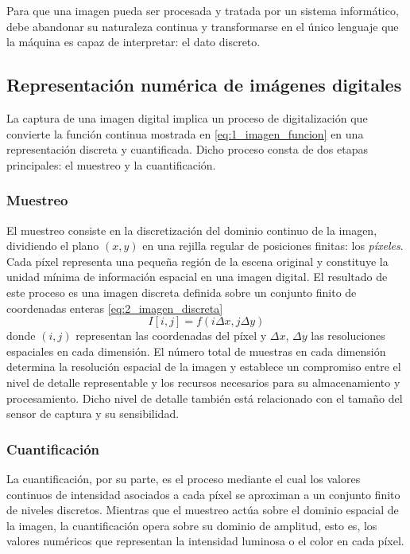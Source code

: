 Para que una imagen pueda ser procesada y tratada por un sistema informático, debe
abandonar su naturaleza continua y transformarse en el único lenguaje que la 
máquina es capaz de interpretar: el dato discreto.

\newpage

\subsection{Representación numérica de imágenes digitales} \label{subsec:3_2_representacion_numerica_imagenes_digitales}
La captura de una imagen digital implica un proceso de digitalización que convierte la función continua
mostrada en \eqref{eq:1_imagen_funcion} en una representación discreta y cuantificada. 
Dicho proceso consta de dos etapas principales: el muestreo y la cuantificación.

\subsubsection{Muestreo} \label{subsubsec:3_2_1_muestreo}
El muestreo consiste en la discretización del dominio continuo de la imagen, dividiendo 
el plano $(x, y)$ en una rejilla regular de posiciones finitas: los \textit{píxeles}. Cada píxel representa una pequeña región de la escena original
y constituye la unidad mínima de información espacial en una imagen digital. 
El resultado de este proceso es una imagen discreta definida sobre un conjunto finito de 
coordenadas enteras \eqref{eq:2_imagen_discreta}
\begin{equation}
    I[i,j] = f(i \Delta x, j \Delta y)
    \label{eq:2_imagen_discreta}
\end{equation}
donde $(i,j)$ representan las coordenadas del píxel y $\Delta x$, $\Delta y$ las resoluciones
espaciales en cada dimensión. El número total de muestras en cada dimensión determina la 
resolución espacial de la imagen y establece un compromiso entre el nivel de detalle representable 
y los recursos necesarios para su almacenamiento y procesamiento. Dicho nivel de detalle también 
está relacionado con el tamaño del sensor de captura y su sensibilidad.

\subsubsection{Cuantificación} \label{subsubsec:3_2_2_cuantificacion}
La cuantificación, por su parte, es el proceso mediante el cual los valores continuos de intensidad
asociados a cada píxel se aproximan a un conjunto finito de niveles discretos. Mientras que el muestreo 
actúa sobre el dominio espacial de la imagen, la cuantificación opera sobre su dominio de amplitud, esto 
es, los valores numéricos que representan la intensidad luminosa o el color en cada píxel.

